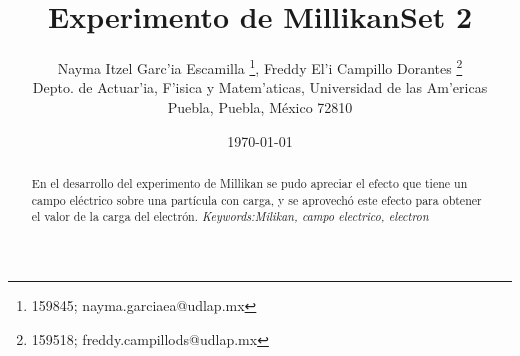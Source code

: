 \documentclass{article}
\begin{document}

\renewcommand{\footrulewidth}{1pt}
\renewcommand{\tablename}{Tabla}


\title{Experimento de Millikan\small{Set 2}}
\author{\small{ {Nayma Itzel Garc'ia Escamilla \footnote{159845; nayma.garciaea@udlap.mx}}, {Freddy El'i Campillo Dorantes \footnote{159518; freddy.campillods@udlap.mx}}}\\ \small{Depto. de Actuar'ia, F'isica y Matem'aticas, Universidad de las Am'ericas Puebla, Puebla, M\'exico 72810}}
\date{\small{\today}}
\maketitle

\begin{abstract}

En el desarrollo del experimento de Millikan se pudo apreciar el efecto que tiene un campo eléctrico sobre una partícula con carga, y se aprovechó este efecto para obtener el valor de la carga del electrón.
{\it Keywords:Milikan, campo electrico, electron}
\end{abstract}
\end{document}
